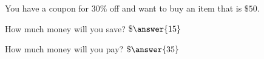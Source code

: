 \documentclass{ximera}
\author{David Kish}
\begin{document}
   \begin{exercise}
 You have a coupon for $30\%$ off and want to buy an item that is $\$50$. 

How much money will you save? $\$\answer{15}$

How much money will you pay? $\$\answer{35}$
 \end{exercise}
\end{document}
